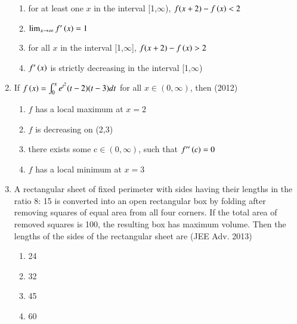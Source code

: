 \documentclass[journal]{IEEEtran}
\begin{document}
\begin{enumerate}
{            \begin{enumerate}
                \item for at least one $x$ in the interval [1,$\infty$), $f(x+2)-f\left(x\right)<2$
                \item $\lim_{x\to\infty} f^{\prime}\left(x\right) = 1$
                \item for all $x$ in the interval [1,$\infty$], $f(x+2)-f\left(x\right)>2$
                \item $f^{\prime}\left(x\right)$ is strictly decreasing in the interval [1,$\infty$)
            \end{enumerate}
        
        }
    \item{
        
            If $f\left(x\right)= \int_{0}^x e^{t^2}(t-2)(t-3)dt$ for all $x \in(0,\infty)$, then
             \hfill
                {(2012)}
            
            \begin{enumerate}
                \item $f$ has a local maximum at $x=2$ 
                \item $f$ is decreasing on (2,3)
                \item there exists some c$\in(0,\infty)$, such that $f^{\prime\prime}\left(c\right)=0$
                \item $f$ has a local minimum at $x=3$
            \end{enumerate}
        
        }
    \item{
    
        
            A rectangular sheet of fixed perimeter with sides having their lengths in the ratio 8: 15 is converted into an open rectangular box by folding after removing squares of equal area from all four corners. If the total area of removed squares is 100, the resulting box has maximum volume. Then the lengths of the sides of the rectangular sheet are
             \hfill
                {(JEE Adv. 2013)}
            \begin{multicols}{2}
                \begin{enumerate}
                    \item 24
                    \item 32
                    \item 45
                    \item 60
                \end{enumerate}
            \end{multicols}

}
\end{enumerate}
\end{document}
